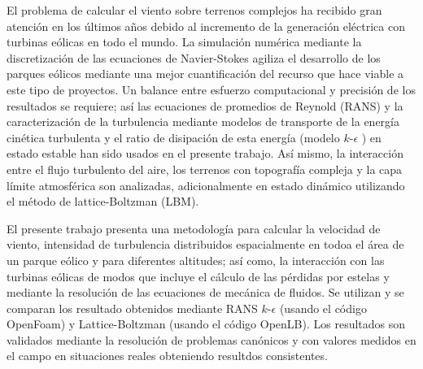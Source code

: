 


\begin{abstracts}        %

El problema de calcular el viento sobre terrenos complejos ha recibido gran atención en los últimos años debido al incremento de la generación eléctrica con turbinas eólicas en todo el mundo. La simulación numérica mediante la discretización de las ecuaciones de Navier-Stokes agiliza el desarrollo de los parques eólicos mediante una mejor cuantificación del recurso que hace viable a este tipo de proyectos. Un balance entre esfuerzo computacional y precisión de los resultados se requiere; así las ecuaciones de promedios de Reynold (RANS) y la caracterización de la  turbulencia mediante modelos de transporte de la energía cinética turbulenta y el ratio de disipación de esta energía (modelo $k$-$\epsilon$ ) en estado estable han sido usados en el presente trabajo. Así mismo, la interacción entre el flujo turbulento del aire, los terrenos con topografía compleja y la capa límite atmosférica son analizadas, adicionalmente en estado dinámico utilizando el método de lattice-Boltzman (LBM).

El presente trabajo presenta una metodología para calcular la velocidad de viento, intensidad de turbulencia distribuidos espacialmente en todoa el área de un parque eólico y para diferentes altitudes; así como, la interacción con las turbinas eólicas de modos que incluye el cálculo de las pérdidas por estelas y mediante la resolución de las ecuaciones de mecánica de fluidos. Se utilizan y se comparan los resultado obtenidos mediante RANS $k$-$\epsilon$ (usando el código OpenFoam) y Lattice-Boltzman (usando el código OpenLB). Los resultados son validados mediante la resolución de problemas canónicos y con valores medidos en el campo en situaciones reales obteniendo resultdos consistentes.


\end{abstracts}


